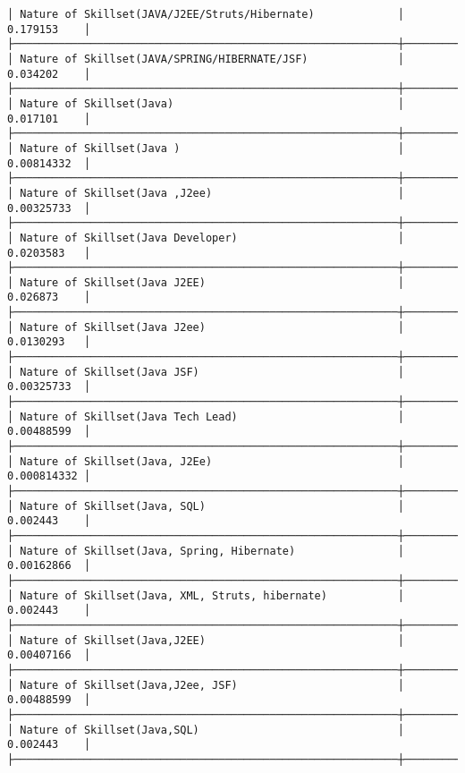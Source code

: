 \documentclass[11pt]{article}
\begin{document}
\begin{Verbatim}[commandchars=\\\{\}]
│ Nature of Skillset(JAVA/J2EE/Struts/Hibernate)             │ 0.179153    │
├────────────────────────────────────────────────────────────┼─────────────┤
│ Nature of Skillset(JAVA/SPRING/HIBERNATE/JSF)              │ 0.034202    │
├────────────────────────────────────────────────────────────┼─────────────┤
│ Nature of Skillset(Java)                                   │ 0.017101    │
├────────────────────────────────────────────────────────────┼─────────────┤
│ Nature of Skillset(Java )                                  │ 0.00814332  │
├────────────────────────────────────────────────────────────┼─────────────┤
│ Nature of Skillset(Java ,J2ee)                             │ 0.00325733  │
├────────────────────────────────────────────────────────────┼─────────────┤
│ Nature of Skillset(Java Developer)                         │ 0.0203583   │
├────────────────────────────────────────────────────────────┼─────────────┤
│ Nature of Skillset(Java J2EE)                              │ 0.026873    │
├────────────────────────────────────────────────────────────┼─────────────┤
│ Nature of Skillset(Java J2ee)                              │ 0.0130293   │
├────────────────────────────────────────────────────────────┼─────────────┤
│ Nature of Skillset(Java JSF)                               │ 0.00325733  │
├────────────────────────────────────────────────────────────┼─────────────┤
│ Nature of Skillset(Java Tech Lead)                         │ 0.00488599  │
├────────────────────────────────────────────────────────────┼─────────────┤
│ Nature of Skillset(Java, J2Ee)                             │ 0.000814332 │
├────────────────────────────────────────────────────────────┼─────────────┤
│ Nature of Skillset(Java, SQL)                              │ 0.002443    │
├────────────────────────────────────────────────────────────┼─────────────┤
│ Nature of Skillset(Java, Spring, Hibernate)                │ 0.00162866  │
├────────────────────────────────────────────────────────────┼─────────────┤
│ Nature of Skillset(Java, XML, Struts, hibernate)           │ 0.002443    │
├────────────────────────────────────────────────────────────┼─────────────┤
│ Nature of Skillset(Java,J2EE)                              │ 0.00407166  │
├────────────────────────────────────────────────────────────┼─────────────┤
│ Nature of Skillset(Java,J2ee, JSF)                         │ 0.00488599  │
├────────────────────────────────────────────────────────────┼─────────────┤
│ Nature of Skillset(Java,SQL)                               │ 0.002443    │
├────────────────────────────────────────────────────────────┼─────────────┤

\end{Verbatim}
\end{document}
